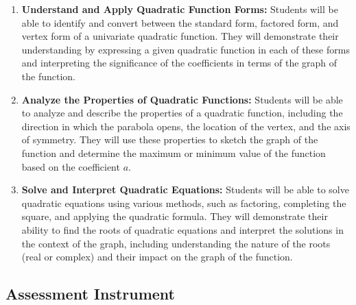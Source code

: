 \begin{enumerate}
    \item \textbf{Understand and Apply Quadratic Function Forms:} Students will be able to identify and convert between the standard form, factored form, and vertex form of a univariate quadratic function. They will demonstrate their understanding by expressing a given quadratic function in each of these forms and interpreting the significance of the coefficients in terms of the graph of the function.
    \item \textbf{Analyze the Properties of Quadratic Functions:} Students will be able to analyze and describe the properties of a quadratic function, including the direction in which the parabola opens, the location of the vertex, and the axis of symmetry. They will use these properties to sketch the graph of the function and determine the maximum or minimum value of the function based on the coefficient $a$.
    \item \textbf{Solve and Interpret Quadratic Equations:} Students will be able to solve quadratic equations using various methods, such as factoring, completing the square, and applying the quadratic formula. They will demonstrate their ability to find the roots of quadratic equations and interpret the solutions in the context of the graph, including understanding the nature of the roots (real or complex) and their impact on the graph of the function.
\end{enumerate}

\subsection{Assessment Instrument}

